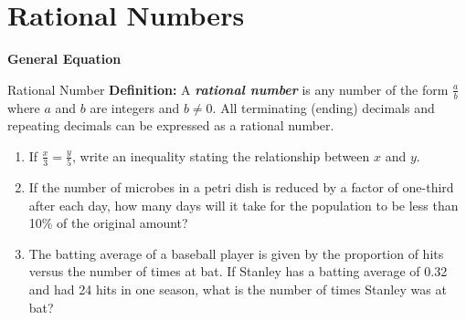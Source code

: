 \section{Rational Numbers}

\bigskip
\textbf{General Equation}

\bigskip
\begin{equationbox}{Rational Number}
\textbf{Definition:} A \textit{\textbf{rational number}} is any number of the form $\frac{a}{b}$ where $a$ and $b$ are integers and $b\neq0$. All terminating (ending) decimals and repeating decimals can be expressed as a rational number.
\end{equationbox}

\bigskip
\begin{enumerate}[labelindent=*,style=multiline,leftmargin=*,label=\textbf{Example \arabic*:}]
\item If $\frac{x}{3}=\frac{y}{5}$, write an inequality stating the relationship between $x$ and $y$.

\vfill\item If the number of microbes in a petri dish is reduced by a factor of one-third after each day, how many days will it take for the population to be less than 10\% of the original amount?

\vfill\item The batting average of a baseball player is given by the proportion of hits versus the number of times at bat. If Stanley has a batting average of 0.32 and had 24 hits in one season, what is the number of times Stanley was at bat?
\end{enumerate}

